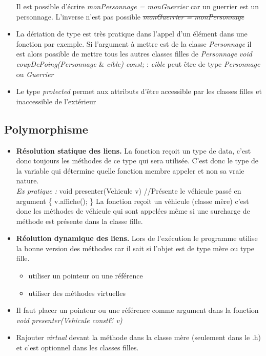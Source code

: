 \documentclass[12pt,a4paper]{article}
\begin{document}
\begin{itemize}
\newline Il est possible d'écrire \textit{monPersonnage = monGuerrier} car un guerrier est un personnage. L'inverse n'est pas possible \sout{\textit{monGuerrier = monPersonnage}}
\item La dériation de type est très pratique dans l'appel d'un élément dans une fonction par exemple. Si l'argument à mettre est de la classe \textit{Personnage} il est alors possible de mettre tous les autres classes filles de \textit{Personnage}
\newline \textit{void coupDePoing(Personnage} \& \textit{cible) const;} : \textit{cible} peut être de type \textit{Personnage} ou \textit{Guerrier}
\item Le type \textit{protected} permet aux attributs d'être accessible par les classes filles et inaccessible de l'extérieur
\end{itemize}

\subsection{Polymorphisme}
\begin{itemize}
\item \textbf{Résolution statique des liens.} La fonction reçoit un type de data, c'est donc toujours les méthodes de ce type qui sera utilisée. C'est donc le type de la variable qui détermine quelle fonction membre appeler et non sa vraie nature.\\
\textit{Ex pratique : } 
\newline void presenter(Vehicule v)  //Présente le véhicule passé en argument
\newline \{  v.affiche(); \}
\newline La fonction reçoit un véhicule (classe mère) c’est donc les méthodes de véhicule qui sont appelées même si une surcharge de méthode est présente dans la classe fille.
\item \textbf{Réolution dynamique des liens.} Lors de l'exécution le programme utilise la bonne version des méthodes car il sait si l'objet est de type mère ou type fille.
\begin{itemize}
\item utiliser un pointeur ou une référence
\item utiliser des méthodes virtuelles
\end{itemize}
\item Il faut placer un pointeur ou une référence comme argument dans la fonction \textit{void presenter(Vehicule const\& v)}
\item Rajouter \textit{virtual} devant la méthode dans la classe mère (seulement dans le .h) et c’est optionnel dans les classes filles.
\end{itemize}
\end{document}
